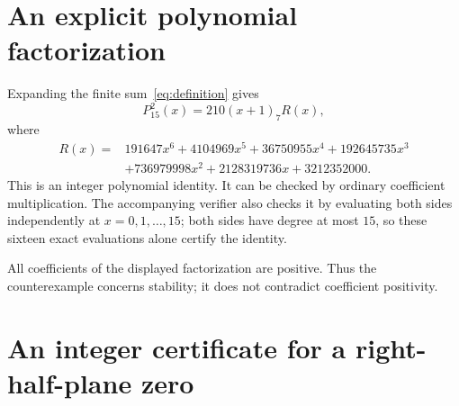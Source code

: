 \documentclass[10pt]{article}
\begin{document}
\section*{An explicit polynomial factorization}

Expanding the finite sum~\eqref{eq:definition} gives
\begin{equation}
 P_{15}^2(x)=210(x+1)_7 R(x),
 \label{eq:factor}
\end{equation}
where
\begin{align*}
 R(x)={}&191647x^6+4104969x^5+36750955x^4+192645735x^3\\
        &+736979998x^2+2128319736x+3212352000.
\end{align*}
This is an integer polynomial identity. It can be checked by ordinary
coefficient multiplication. The accompanying verifier also checks it by
evaluating both sides independently at $x=0,1,\ldots,15$;
both sides have degree at most $15$, so these sixteen exact evaluations
alone certify the identity.

All coefficients of the displayed factorization are positive.
Thus the counterexample concerns stability; it does not contradict
coefficient positivity.

\section*{An integer certificate for a right-half-plane zero}
\end{document}

